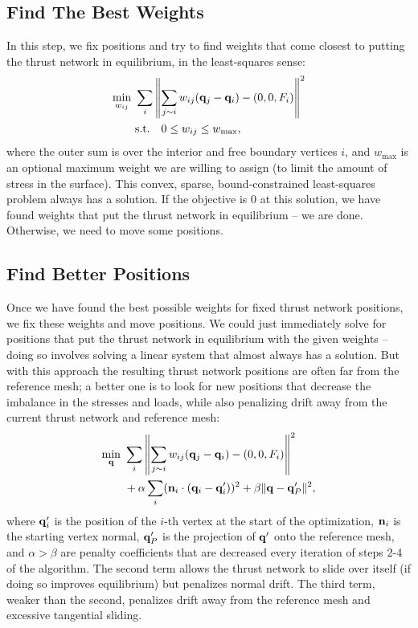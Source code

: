 \documentclass[annual]{acmsiggraph}
\begin{document}
\subsection{Find The Best Weights} \label{sec:optweights}
In this step, we fix positions and try to find weights that come closest to putting the thrust network in equilibrium, in the least-squares sense:
\begin{align*}
\min_{w_{ij}}\ &\sum_i \left\| \sum_{j\sim i} w_{ij} ({\mathbf q}_j - {\mathbf q}_i) - (0,0,F_i) \right\|^2\\
&\textrm{s.t.}\quad 0 \leq w_{ij} \leq w_{\textrm{max}},
\end{align*}
where the outer sum is over the interior and free boundary vertices $i$, and $w_\textrm{max}$ is an optional maximum weight we are willing to assign (to limit the amount of stress in the surface). This convex, sparse, bound-constrained least-squares problem always has a solution. If the objective is $0$ at this solution, we have found weights that put the thrust network in equilibrium -- we are done. Otherwise, we need to move some positions.

\subsection{Find Better Positions}
Once we have found the best possible weights for fixed thrust network positions, we fix these weights and move positions. We could just immediately solve for positions that put the thrust network in equilibrium with the given weights -- doing so involves solving a linear system that almost always has a solution. But with this approach the resulting thrust network positions are often far from the reference mesh; a better one is to look for new positions that decrease the imbalance in the stresses and loads, while also penalizing drift away from the current thrust network and reference mesh:
\begin{align*}
\min_{{\mathbf q}}\ &\sum_i \left\| \sum_{j\sim i} w_{ij} ({\mathbf q}_j - {\mathbf q}_i) - (0,0,F_i) \right\|^2 \\
&+ \alpha \sum_i ({\mathbf n}_i \cdot ({\mathbf q}_i - {\mathbf q}'_i) )^2 + \beta \|{\mathbf q} - {\mathbf q}'_P\|^2,
\end{align*}
where ${\mathbf q}'_i$ is the position of the $i$-th vertex at the start of the optimization, ${\mathbf n}_i$ is the starting vertex normal, ${\mathbf q}'_P$ is the projection of ${\mathbf q}'$ onto the reference mesh, and $\alpha > \beta$ are penalty coefficients that are decreased every iteration of steps 2-4 of the algorithm. The second term allows the thrust network to slide over itself (if doing so improves equilibrium) but penalizes normal drift. The third term, weaker than the second, penalizes drift away from the reference mesh and excessive tangential sliding.
\end{document}
